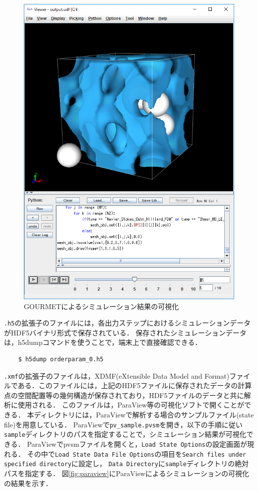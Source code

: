 \documentclass[pdflatex,a4paper,10pt,ja=standard]{bxjsarticle}
\begin{document}
\begin{figure}[htbp]
    \centering
    \includegraphics[width=8truecm]{gourmet_output_ss.png}
    \caption{GOURMETによるシミュレーション結果の可視化}
    \label{fig:gourmet_output}
\end{figure}

\verb|.h5|の拡張子のファイルには，各出力ステップにおけるシミュレーションデータがHDF5バイナリ形式で保存されている．
保存されたシミュレーションデータは，h5dumpコマンドを使うことで，端末上で直接確認できる．
\begin{verbatim}
    $ h5dump orderparam_0.h5
\end{verbatim}
\verb|.xmf|の拡張子のファイルは，XDMF(eXtensible Data Model and Format)ファイルである．このファイルには，上記のHDF5ファイルに保存されたデータの計算点の空間配置等の幾何構造が保存されており，HDF5ファイルのデータと共に解析に使用される．
このファイルは，ParaView\autocite{paraview}等の可視化ソフトで開くことができる．
本ディレクトリには，ParaViewで解析する場合のサンプルファイル(state file)を用意している．
ParaViewで\verb|pv_sample.pvsm|を開き，以下の手順に従い\verb|sample|ディレクトリのパスを指定することで，シミュレーション結果が可視化できる．
ParaViewでpvsmファイルを開くと，\verb|Load State Options|の設定画面が現れる．
その中で\verb|Load State Data File Options|の項目を\verb|Search files under specified directory|に設定し，
\verb|Data Directory|に\verb|sample|ディレクトリの絶対パスを指定する．
図\ref{fig:paraview}にParaViewによるシミュレーションの可視化の結果を示す．
\end{document}
